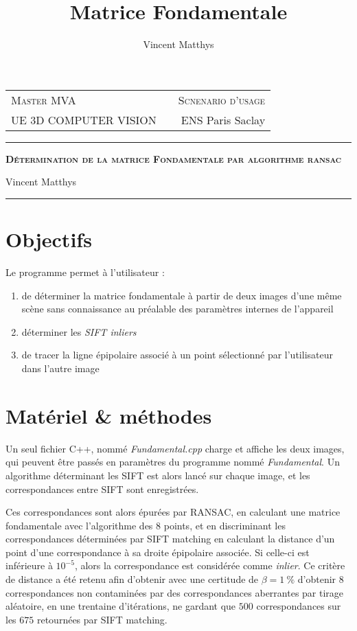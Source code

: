 \documentclass[12pt,a4paper,onecolumn]{article}
\title{Matrice Fondamentale}
\author{Vincent Matthys}
\begin{document}
\begin{tabularx}{\textwidth}{@{} l X r @{} }
	{\textsc{Master MVA}}          &  & \textsc{Scnenario d'usage} \\
	\textsc{UE 3D COMPUTER VISION} &  & {ENS Paris Saclay}         \\
\end{tabularx}
\vspace{1.5cm}
\begin{center}

	\rule[11pt]{5cm}{0.5pt}

	\textbf{\LARGE \textsc{Détermination de la matrice Fondamentale par algorithme ransac}}
	\vspace{0.5cm}

	Vincent Matthys


	\rule{5cm}{0.5pt}

	\vspace{1.5cm}
\end{center}

\section{Objectifs}
Le programme permet à l'utilisateur :
\begin{enumerate}
	\item de déterminer la matrice fondamentale à partir de deux images d'une même scène sans connaissance au préalable des paramètres internes de l'appareil
	\item déterminer les \textit{SIFT inliers}
	\item de tracer la ligne épipolaire associé à un point sélectionné par l'utilisateur dans l'autre image
\end{enumerate}


\section{Matériel \& méthodes}
Un seul fichier C++, nommé \textit{Fundamental.cpp} charge et affiche les deux images, qui peuvent être passés en paramètres du programme nommé \textit{Fundamental}. Un algorithme déterminant les SIFT est alors lancé sur chaque image, et les correspondances entre SIFT sont enregistrées.

Ces correspondances sont alors épurées par RANSAC, en calculant une matrice fondamentale avec l'algorithme des 8 points, et en discriminant les correspondances déterminées par SIFT matching en calculant la distance d'un point d'une correspondance à sa droite épipolaire associée. Si celle-ci est inférieure à \(10^{-5}\), alors la correspondance est considérée comme \textit{inlier}. Ce critère de distance a été retenu afin d'obtenir avec une certitude de \( \beta = 1~\%\) d'obtenir 8 correspondances non contaminées par des correspondances aberrantes par tirage aléatoire, en une trentaine d'itérations, ne gardant que \( 500\) correspondances sur les \( 675 \) retournées par SIFT matching.
\end{document}
